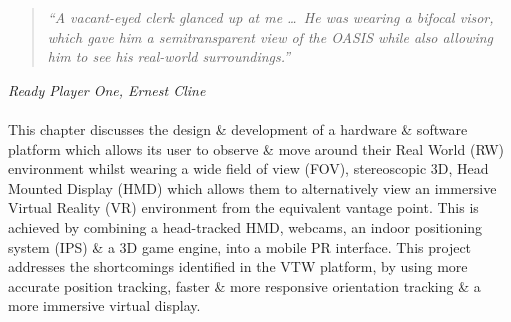 \begin{quote}
	\textit{``A vacant-eyed clerk glanced up at me \ldots\ He was wearing a bifocal visor, which gave him a semitransparent view of the OASIS while also allowing him to see his real-world surroundings.''}%
\end{quote}
\hfill \textit{Ready Player One, Ernest Cline}
\\
\\


This chapter discusses the design \& development of a hardware \& software platform which allows its user to observe \& move around their Real World (RW) environment whilst wearing a wide field of view (FOV), stereoscopic 3D, Head Mounted Display (HMD) which allows them to alternatively view an immersive Virtual Reality (VR) environment from the equivalent vantage point. This is achieved by combining a head-tracked HMD, webcams, an indoor positioning system (IPS) \& a 3D game engine, into a mobile PR interface. This project addresses the shortcomings identified in the VTW platform, by using more accurate position tracking, faster \& more responsive orientation tracking \& a more immersive virtual display.





